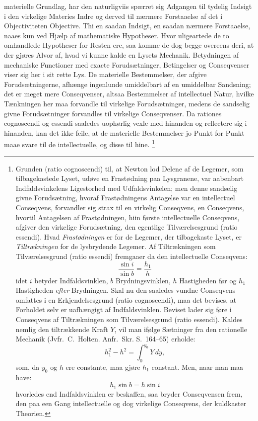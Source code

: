 \documentclass[12pt]{book}
\newcommand{\opage}[1]{\marginnote{\footnotesize\textit{[#1]}}}
\begin{document}
materielle Grundlag, har den naturligviis spærret sig Adgangen til tydelig Indsigt i den
virkelige Materies Indre og derved til nærmere Forstaaelse af det i Objectiviteten Objective.
Thi en saadan Indsigt, en saadan nærmere Forstaaelse, naaes kun ved Hjælp af mathematiske
Hypotheser. Hvor uligeartede de to omhandlede Hypotheser for Resten ere, saa komme de dog
begge overeens deri, at der gjøres Alvor af, hvad vi kunne kalde en Lysets Mechanik.
Betydningen af mechaniske Functioner med exacte Forudsætninger, Betingelser og Conseqvenser
viser sig her i sit rette Lys. De materielle Bestemmelser, der afgive Forudsætningerne,
afhænge ingenlunde umiddelbart af en umiddelbar Sandsning; det er meget mere Conseqvenser,
altsaa Bestemmelser af intellectuel Natur, hvilke Tænkningen her maa forvandle til virkelige
Forudsætninger, medens de sandselig givne Forudsætninger forvandles til virkelige
Conseqvenser. Da rationes cognoscendi og essendi saaledes uophørlig vexle med hinanden og
reflectere
\opage{381} sig i hinanden, kan det ikke feile, at de materielle Bestemmelser jo Punkt for Punkt maae
svare til de intellectuelle, og disse til hine.%
\footnote{Grunden (ratio cognoscendi) til, at Newton lod Delene af de Legemer, som
  tilbagekastede Lyset, udøve en Frastødning paa Lysgranene, var aabenbart Indfaldsvinkelens
  Ligestorhed med Udfaldsvinkelen; men denne sandselig givne Forudsætning, hvoraf
  Frastødningens Antagelse var en intellectuel Conseqvens, forvandler sig strax til en virkelig
  Conseqvens, en Conseqvens, hvortil Antagelsen af Frastødningen, hiin første intellectuelle
  Conseqvens, afgiver den virkelige Forudsætning, den egentlige Tilværelsesgrund (ratio
  essendi). Hvad \emph{Frastødningen} er for de Legemer, der tilbagekaste Lyset, er
  \emph{Tiltrækningen} for de lysbrydende Legemer. Af Tiltrækningen som Tilværelsesgrund (ratio
  essendi) fremgaaer da den intellectuelle Conseqvens:
  \[ \frac{\sin i}{\sin b} = \frac{h_{1}}{h} \]
  idet $i$ betyder Indfaldsvinklen, $b$ Brydningsvinklen, $h$ Hastigheden før og $h_{1}$
  Hastigheden \emph{efter} Brydningen. Skal nu den saaledes vundne Conseqvens omfattes i en
  Erkjendelsesgrund (ratio cognoscendi), maa det bevises, at Forholdet selv er uafhængigt af
  Indfaldsvinklen. Beviset lader sig føre i Conseqvens af Tiltrækningen som Tilværelsesgrund
  (ratio essendi). Kaldes nemlig den tiltrækkende Kraft $Y$, vil man ifølge Sætninger fra den
  rationelle Mechanik (Jvfr.\ C.\ Holten. Anfr.\ Skr. S.~164--65) erholde:
  \[ h_{1}^{2} - h^{2} = \int_{0}^{y_{0}} Y\,dy, \]
  som, da $y_{0}$ og $h$ ere constante, maa gjøre $h_{1}$ constant. Men, naar man maa have:
  \[ h_{1}\sin b = h\sin i \]
  hvorledes end Indfaldsvinklen er beskaffen, saa bryder Conseqvensen frem, den paa een Gang
  intellectuelle og dog virkelige Conseqvens, der kuldkaster Theorien.}
\end{document}
